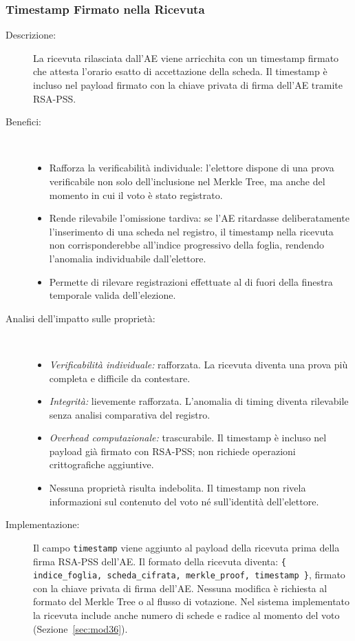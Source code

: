 \documentclass[12pt,a4paper]{article}
\begin{document}
\subsubsection{Timestamp Firmato nella Ricevuta}
\label{sec:mod32}

\begin{description}
  \item[Descrizione:] La ricevuta rilasciata dall'AE viene arricchita con un timestamp firmato che attesta l'orario esatto di accettazione della scheda. Il timestamp è incluso nel payload firmato con la chiave privata di firma dell'AE tramite RSA-PSS.
  \item[Benefici:] \
    \begin{itemize}
      \item Rafforza la verificabilità individuale: l'elettore dispone di una prova verificabile non solo dell'inclusione nel Merkle Tree, ma anche del momento in cui il voto è stato registrato.
      \item Rende rilevabile l'omissione tardiva: se l'AE ritardasse deliberatamente l'inserimento di una scheda nel registro, il timestamp nella ricevuta non corrisponderebbe all'indice progressivo della foglia, rendendo l'anomalia individuabile dall'elettore.
      \item Permette di rilevare registrazioni effettuate al di fuori della finestra temporale valida dell'elezione.
    \end{itemize}
  \item[Analisi dell'impatto sulle proprietà:] \
    \begin{itemize}
      \item \textit{Verificabilità individuale:} rafforzata. La ricevuta diventa una prova più completa e difficile da contestare.
      \item \textit{Integrità:} lievemente rafforzata. L'anomalia di timing diventa rilevabile senza analisi comparativa del registro.
      \item \textit{Overhead computazionale:} trascurabile. Il timestamp è incluso nel payload già firmato con RSA-PSS; non richiede operazioni crittografiche aggiuntive.
      \item Nessuna proprietà risulta indebolita. Il timestamp non rivela informazioni sul contenuto del voto né sull'identità dell'elettore.
    \end{itemize}
  \item[Implementazione:] Il campo \texttt{timestamp} viene aggiunto al payload della ricevuta prima della firma RSA-PSS dell'AE. Il formato della ricevuta diventa: \texttt{\{ indice\_foglia, scheda\_cifrata, merkle\_proof, timestamp \}}, firmato con la chiave privata di firma dell'AE. Nessuna modifica è richiesta al formato del Merkle Tree o al flusso di votazione. Nel sistema implementato la ricevuta include anche numero di schede e radice al momento del voto (Sezione~\ref{sec:mod36}).
\end{description}
\end{document}
